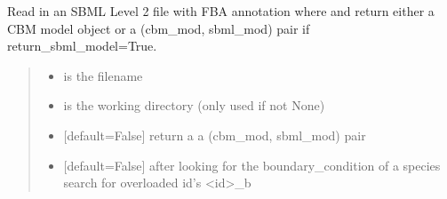 \documentclass[letterpaper,12pt,english]{sphinxmanual}
\begin{document}
\begin{fulllineitems}
\label{\detokenize{api/io:cbmpy.CBXML.sbml_readSBML2FBA}}
\pysigstartsignatures
\pysiglinewithargsret
{}
{\sphinxparamcomma {}\sphinxparamcomma {}\sphinxparamcomma {}}
{}
\pysigstopsignatures
\sphinxAtStartPar
Read in an SBML Level 2 file with FBA annotation where and return either a CBM model object or a (cbm\_mod, sbml\_mod) pair if return\_sbml\_model=True.
\begin{quote}\begin{description}
\begin{itemize}
\item {} 
\sphinxAtStartPar
{} \textendash{} is the filename

\item {} 
\sphinxAtStartPar
{} \textendash{} is the working directory (only used if not None)

\item {} 
\sphinxAtStartPar
{} \textendash{} {[}default=False{]} return a a (cbm\_mod, sbml\_mod) pair

\item {} 
\sphinxAtStartPar
{} \textendash{} {[}default=False{]} after looking for the boundary\_condition of a species search for overloaded id’s \textless{}id\textgreater{}\_b

\end{itemize}

\end{description}\end{quote}

\end{fulllineitems}

\end{document}
